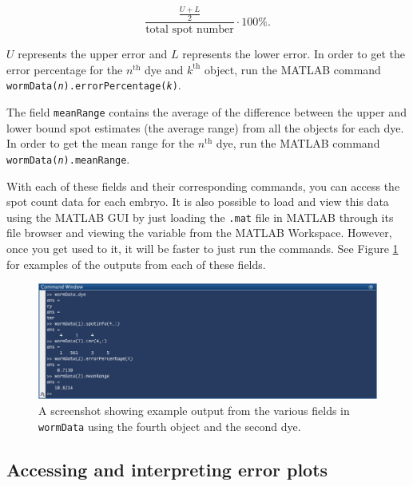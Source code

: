 \documentclass[titlepage,11pt]{article}
\begin{document}
\begin{equation}
\frac{\frac{U + L}{2}}{\textrm{total spot number}}\cdot100\%.
\end{equation}

\noindent$U$ represents the upper error and $L$ represents the lower error. In order to get the error percentage for the $n^{\text{th}}$ dye and $k^{\text{th}}$ object, run the MATLAB command \texttt{wormData(\textit{n}).errorPercentage(\textit{k})}.

The field \texttt{meanRange} contains the average of the difference between the upper and lower bound spot estimates (the average range) from all the objects for each dye. In order to get the mean range for the $n^{\text{th}}$ dye, run the MATLAB command \texttt{wormData(\textit{n}).meanRange}.

With each of these fields and their corresponding commands, you can access the spot count data for each embryo. It is also possible to load and view this data using the MATLAB GUI by just loading the \texttt{.mat} file in MATLAB through its file browser and viewing the variable from the MATLAB Workspace. However, once you get used to it, it will be faster to just run the commands. See Figure \ref{fig:wormDataOutput} for examples of the outputs from each of these fields.

\begin{figure}[H]
\centering
\includegraphics[scale=0.42]{wormDataOutput}
\caption{A screenshot showing example output from the various fields in \texttt{wormData} using the fourth object and the second dye.}
\label{fig:wormDataOutput}
\end{figure}

\subsection{Accessing and interpreting error plots}
\end{document}
